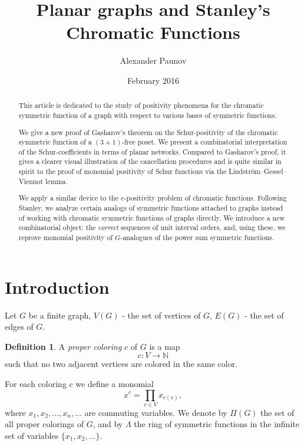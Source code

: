 \documentclass{article}
\theoremstyle{plain}
\theoremstyle{definition}
\newtheorem{defn}[thm]{Definition}
\begin{document}
 

\title{Planar graphs and Stanley's Chromatic Functions} 
\author{Alexander Paunov} 
\date{February 2016} 
\maketitle

\pagestyle{plain}

\begin{abstract}

  This article is dedicated to the study of positivity phenomena
  for the chromatic symmetric function of a graph with respect to various bases of symmetric functions.

We give a new proof of Gasharov's theorem on the Schur-positivity of  the chromatic symmetric function of a $(3+1)$-free poset. We present a combinatorial interpretation of the Schur-coefficients in
  terms of planar networks. Compared to Gasharov's proof, it gives a
  clearer visual illustration of the cancellation procedures and is
  quite similar in spirit to the proof of monomial positivity of Schur
  functions via the Lindström–Gessel–Viennot lemma. 

  We apply a similar device to the $e$-positivity problem of chromatic
  functions. Following Stanley, we analyze certain analogs
  of symmetric functions attached to graphs instead of working with chromatic
  symmetric functions of graphs directly.  We introduce a new
  combinatorial object: the {\em correct} sequences of unit interval
  orders, and, using these, we reprove monomial positivity of
  $G$-analogues of the power sum symmetric functions.

\end{abstract}

\section{Introduction}

Let $G$ be a finite graph, $V(G)$ - the set of vertices of $G$, $E(G)$ - the set of edges of $G$. 

\begin{defn} \label{coloring} A {\em proper coloring} $c$ of  $G$ is
  a map $$c:V\rightarrow\mathbb{N}$$ such that no two adjacent
  vertices are colored in the same color.
\end{defn}

For each coloring $c$ we define a monomial $$x^c = \prod_{v\in
  V}x_{c(v)},$$ where $x_1, x_2, ..., x_n,...$ are commuting
variables.  We denote by $\Pi(G)$ the set of all proper colorings
of $G$, and by  $\Lambda$ the ring of symmetric functions in the infinite set
of variables $\{x_1, x_2,...\}.$
\end{document}
